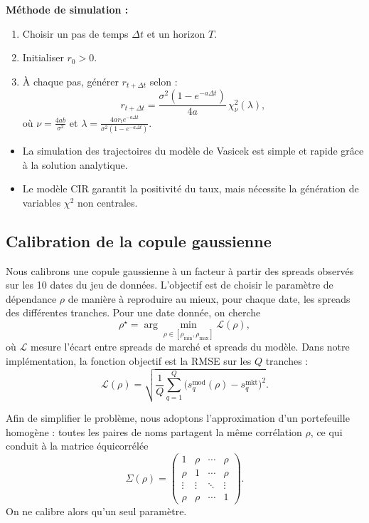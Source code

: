 \textbf{Méthode de simulation :}
\begin{enumerate}
    \item Choisir un pas de temps $\Delta t$ et un horizon $T$.
    \item Initialiser $r_0 > 0$.
    \item À chaque pas, générer $r_{t+\Delta t}$ selon :
    \[
        r_{t+\Delta t} = \frac{\sigma^2 (1 - e^{-a \Delta t})}{4a} \, \chi^2_{\nu}(\lambda),
    \]
    où $\nu = \frac{4ab}{\sigma^2}$ et $\lambda = \frac{4 a r_t e^{-a \Delta t}}{\sigma^2 (1 - e^{-a \Delta t})}$.
\end{enumerate}


\begin{itemize}
    \item La simulation des trajectoires du modèle de Vasicek est simple et rapide grâce à la solution analytique.
    \item Le modèle CIR garantit la positivité du taux, mais nécessite la génération de variables $\chi^2$ non centrales.
\end{itemize}




\subsection{Calibration de la copule gaussienne}

Nous calibrons une copule gaussienne à un facteur à partir des spreads observés sur les
10 dates du jeu de données. L’objectif est de choisir le paramètre de dépendance \(\rho\)
de manière à reproduire au mieux, pour chaque date, les spreads des différentes tranches.
Pour une date donnée, on cherche
\[
\rho^\star
= \arg\min_{\rho \in [\rho_{\min},\rho_{\max}]} \mathcal{L}(\rho),
\]
où \(\mathcal{L}\) mesure l’écart entre spreads de marché et spreads du modèle. Dans notre
implémentation, la fonction objectif est la RMSE sur les \(Q\) tranches :
\[
\mathcal{L}(\rho)
= \sqrt{\frac{1}{Q}\sum_{q=1}^Q \big(s^{\mathrm{mod}}_q(\rho)-s^{\mathrm{mkt}}_q\big)^2 }.
\]

Afin de simplifier le problème, nous adoptons l’approximation d’un portefeuille homogène :
toutes les paires de noms partagent la même corrélation \(\rho\), ce qui conduit à la matrice
équicorrélée
\[
\Sigma(\rho)=
\begin{pmatrix}
1 & \rho & \cdots & \rho \\
\rho & 1 & \cdots & \rho \\
\vdots & \vdots & \ddots & \vdots \\
\rho & \rho & \cdots & 1
\end{pmatrix}.
\]
On ne calibre alors qu’un seul paramètre.

